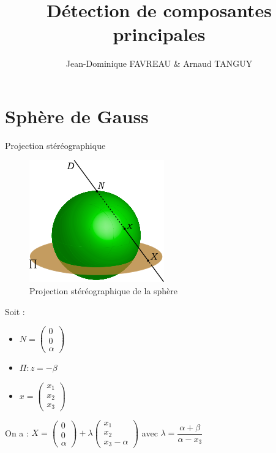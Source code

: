\documentclass[11pt]{beamer}
\author{Jean-Dominique FAVREAU \& Arnaud TANGUY}
\title{Détection de composantes principales}
\begin{document}
\begin{frame}
\titlepage
\end{frame}

\section{Sphère de Gauss}
\begin{frame}{Projection stéréographique}
\begin{multicols}{2}
\begin{figure}[hbtp]
\centering
\includegraphics[scale=.6]{220px-Stereo.png}
\caption{Projection stéréographique de la sphère}
\end{figure}
\columnbreak
Soit : \begin{itemize}
\item $N=\left(\begin{array}{l}0\\ 0\\ \alpha\end{array}\right)$
\item $\Pi : z=-\beta$
\item $x=\left(\begin{array}{l}x_1\\ x_2\\ x_3\end{array}\right)$
\end{itemize}
On a : $X = \left(\begin{array}{l}0\\ 0\\ \alpha\end{array}\right)+\lambda\left(\begin{array}{l}x_1\\ x_2\\ x_3-\alpha\end{array}\right)$
avec $\lambda = \dfrac{\alpha+\beta}{\alpha-x_3}$
\end{multicols}
\end{frame}
\end{document}
